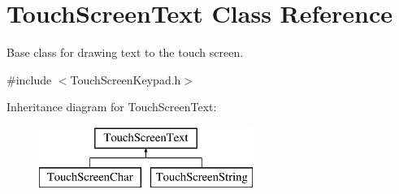 \hypertarget{class_touch_screen_text}{\section{Touch\+Screen\+Text Class Reference}
\label{class_touch_screen_text}
}


Base class for drawing text to the touch screen.  




{\ttfamily \#include $<$Touch\+Screen\+Keypad.\+h$>$}

Inheritance diagram for Touch\+Screen\+Text\+:\begin{figure}[H]
\begin{center}
\leavevmode
\includegraphics[height=2.000000cm]{class_touch_screen_text}
\end{center}
\end{figure}
